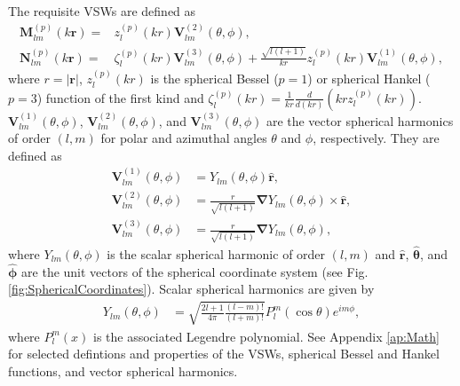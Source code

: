 The requisite VSWs are defined as
%
\begin{align}
\boldsymbol{M}_{l m}^{(p)}(k \boldsymbol{r}) = & z_{l}^{(p)}(kr) \boldsymbol{V}_{lm}^{(2)}(\theta, \phi),
\\
\boldsymbol{N}_{l m}^{(p)}(k \boldsymbol{r}) = & \zeta_{l}^{(p)}(kr) \boldsymbol{V}_{lm}^{(3)}(\theta, \phi) + \frac{\sqrt{l(l+1)}}{kr} z_{l}^{(p)}(kr) \boldsymbol{V}_{lm}^{(1)}(\theta, \phi),
\end{align}
%
where $r = |\boldsymbol{r}|$, $z_{l}^{(p)}(kr)$ is the spherical Bessel ($p=1$) or spherical Hankel ($p=3$) function of the first kind and $ \zeta_{l}^{(p)}(kr) = \frac{1}{kr}\frac{d}{d(kr)} ( kr z_{l}^{(p)}(kr) )$.  $\boldsymbol{V}_{lm}^{(1)}(\theta, \phi)$, $\boldsymbol{V}_{lm}^{(2)}(\theta, \phi)$, and $\boldsymbol{V}_{lm}^{(3)}(\theta, \phi)$ are the vector spherical harmonics of order $(l,m)$ for polar and azimuthal angles $\theta$ and $\phi$, respectively. They are defined as
%
\begin{align}
\boldsymbol{V}_{lm}^{(1)}(\theta, \phi) &= Y_{lm}(\theta, \phi) \boldsymbol{\widehat{r}},
\\
\boldsymbol{V}_{lm}^{(2)}(\theta, \phi) &= \frac{r}{\sqrt{l(l+1)}} \boldsymbol{\nabla} Y_{lm}(\theta, \phi) \times \boldsymbol{\widehat{r}},
\\
\boldsymbol{V}_{lm}^{(3)}(\theta, \phi) &= \frac{r}{\sqrt{l(l+1)}} \boldsymbol{\nabla} Y_{lm}(\theta, \phi),
\end{align}
%
where $Y_{lm}(\theta, \phi)$ is the scalar spherical harmonic of order $(l,m)$ and $\boldsymbol{\widehat{r}}$, $\boldsymbol{\widehat{\theta}}$, and $\boldsymbol{\widehat{\phi}}$ are the unit vectors of the spherical coordinate system (see Fig. \ref{fig:SphericalCoordinates}). Scalar spherical harmonics are given by
%
\begin{align}
Y_{lm}(\theta, \phi) &= \sqrt{\frac{2l+1}{4\pi} \frac{(l-m)!}{(l+m)!}} P_{l}^{m}(\cos{\theta}) e^{im\phi},
\end{align}
%
where $P_{l}^{m}(x)$ is the associated Legendre polynomial. \cite{Olver2017} See Appendix \ref{ap:Math} for selected defintions and properties of the VSWs, spherical Bessel and Hankel functions, and vector spherical harmonics. 

